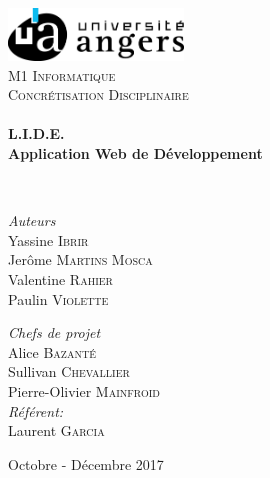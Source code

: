 \begin{titlepage}
\begin{center}

\includegraphics[width=0.35\textwidth]{./img/logo}~\\[1cm]

\textsc{\LARGE M1 Informatique}\\[1.5cm]

\textsc{\Large Concrétisation Disciplinaire}\\[0.5cm]

\HRule \\[0.4cm]

{\huge \bfseries L.I.D.E.\\
Application Web de Développement \\[0.4cm] }

\HRule \\[1.5cm]

\begin{minipage}{0.4\textwidth}
\begin{flushleft} \large
\emph{Auteurs}\\
Yassine \textsc{Ibrir}\\
Jerôme \textsc{Martins Mosca}\\
Valentine \textsc{Rahier}\\
Paulin \textsc{Violette}\\
\end{flushleft}
\end{minipage}
\begin{minipage}{0.4\textwidth}
\begin{flushright} \large
\emph{Chefs de projet}\\
Alice \textsc{Bazanté}\\
Sullivan \textsc{Chevallier}\\
Pierre-Olivier \textsc{Mainfroid}\\
\emph{Référent:} \\
Laurent \textsc{Garcia}
\end{flushright}
\end{minipage}

\vfill

{\large Octobre - Décembre 2017}

\end{center}
\end{titlepage}
